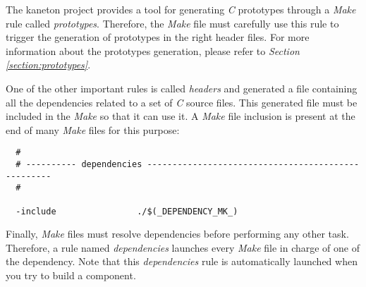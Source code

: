 The kaneton project provides a tool for generating \textit{C} prototypes
through a \textit{Make} rule called \textit{prototypes}. Therefore, the
\textit{Make} file must carefully use this rule to trigger the generation
of prototypes in the right header files. For more information about the
prototypes generation, please refer to \textit{Section
\ref{section:prototypes}}.

One of the other important rules is called \textit{headers} and generated
a file containing all the dependencies related to a set of \textit{C}
source files. This generated file must be included in the \textit{Make}
so that it can use it. A \textit{Make} file inclusion is present at the
end of many \textit{Make} files for this purpose:

\begin{verbatim}
  #
  # ---------- dependencies ---------------------------------------------------
  #

  -include                ./$(_DEPENDENCY_MK_)
\end{verbatim}

Finally, \textit{Make} files must resolve dependencies before performing
any other task. Therefore, a rule named \textit{dependencies} launches
every \textit{Make} file in charge of one of the dependency. Note that this
\textit{dependencies} rule is automatically launched when you try to
build a component.
